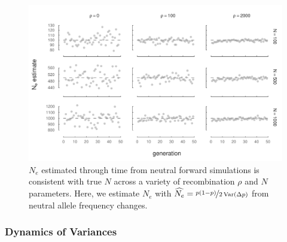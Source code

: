 \documentclass[11pt]{article}
\DeclareMathOperator{\var}{Var}
\begin{document}
\begin{figure}[!ht] \centering
  \includegraphics{./images/supp-Ne-est-neutral.pdf} 
  
  \caption{$N_e$ estimated through time from neutral forward simulations is
  consistent with true $N$ across a variety of recombination $\rho$ and $N$
parameters. Here, we estimate $N_e$ with $\widehat{N_e} = \nicefrac{p(1-p)}{2
\var(\Delta p)}$ from neutral allele frequency changes.}

  \label{fig:ne-neut}
\end{figure}

\clearpage
\newpage

\subsubsection{Dynamics of Variances}
\end{document}
